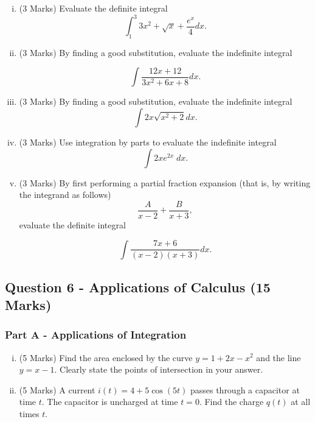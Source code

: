 \documentclass[a4paper,12pt]{article}
\begin{document}
\begin{enumerate}[(i)]
	\item (3 Marks)  Evaluate the definite integral
	\[ \int^3_1 3x^2 + \sqrt{x} + \frac{e^x}{4} dx. \]
	\item (3 Marks) By finding a good substitution, evaluate the indefinite integral
	
	\[ \int \frac{12x + 12}{3x^2 + 6x + 8} dx.\]
	
	\item (3 Marks) By finding a good substitution, evaluate the indefinite integral
	\[ \int 2x\sqrt{x^2 + 2} dx.\]
	\item (3 Marks) Use integration by parts to evaluate the indefinite integral
	\[ \int  2xe^{2x} \;dx. \]
	\item (3 Marks) By first performing a partial fraction expansion (that is, by writing the integrand
	as follows)
	\[  \frac{A}{x - 2} + \frac{B}{x + 3},
	\]evaluate the definite integral
	
	\[ \int \frac{7x + 6}{(x -2)(x + 3)}  dx. \]
	
\end{enumerate}
\bigskip 
\newpage
\subsection*{Question 6 - Applications of Calculus (15 Marks)}

\subsubsection*{Part A - Applications of Integration}
\begin{enumerate}[(i)]
	\item (5 Marks) Find the area enclosed by the curve $y=1+2x-x^2$ and the line $y=x-1$.
	Clearly state the points of intersection in your answer.
	\smallskip
	\item (5 Marks) A current $i(t) = 4 + 5\cos(5t)$ passes through a capacitor at time $t$.
	The capacitor is uncharged at time $ t = 0 $. Find the charge $q(t)$ at all times $t$.
\end{enumerate}
\end{document}
